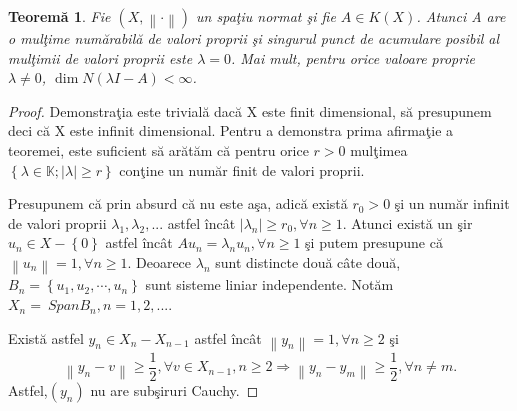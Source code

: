 \documentclass[a4paper,12pt,oneside]{report}
\newtheorem{theorem}{Teorem\u a}
\begin{document}
\begin{theorem}
Fie \(\left ( X, \left \| \cdot  \right \| \right )\) un spa\c{t}iu normat \c{s}i fie \(A \in K\left ( X \right )\). Atunci A are o mul\c{t}ime num\u{a}rabil\u{a} de valori proprii \c{s}i singurul punct de acumulare posibil al mul\c{t}imii de valori proprii este \( \lambda = 0 \). Mai mult, pentru orice valoare proprie \( \lambda \neq 0\), \(\dim N\left ( \lambda I - A \right )< \infty \).
\end{theorem}
\begin{proof}
Demonstra\c{t}ia este trivial\u{a} dac\u{a} X este finit dimensional, s\u{a} presupunem deci c\u{a} X este infinit dimensional. Pentru a demonstra prima afirma\c{t}ie a teoremei, este suficient s\u{a} ar\u{a}t\u{a}m c\u{a} pentru orice \(r> 0\) mul\c{t}imea \(\left \{ \lambda \in \mathbb{K};\left | \lambda  \right |\geq r \right \}\) con\c{t}ine un num\u{a}r finit de valori proprii.

Presupunem c\u{a} prin absurd c\u{a} nu este a\c{s}a, adic\u{a} exist\u{a} \(r_{0}> 0\) \c{s}i un num\u{a}r infinit de valori proprii \(\lambda _{1}, \lambda _{2},...\) astfel \^{i}nc\^{a}t \(\left | \lambda _{n} \right | \geq r_{0}, \forall n\geq 1\). Atunci exist\u{a} un \c{s}ir \(u_{n} \in X -\left \{ 0 \right \}\) astfel \^{i}nc\^{a}t \(Au_{n} = \lambda _{n}u_{n}, \forall n\geq 1\) \c{s}i putem presupune c\u{a} \(\left \| u_{n} \right \| = 1, \forall n\geq 1\). Deoarece \(\lambda _{n}\) sunt distincte dou\u{a} c\^{a}te dou\u{a}, \(B_{n} = \left \{ u_{1},u_{2},\cdots,u_{n} \right \}\) sunt sisteme liniar independente. Not\u{a}m \(X_{n} = \ SpanB_{n} , n=1,2,...\).

Exist\u{a} astfel \(y_{n} \in X_{n} - X_{n-1}\) astfel \^{i}nc\^{a}t \(\left \| y_{n} \right \| = 1, \forall n\geq 2\) \c{s}i
\begin{displaymath}
  \left \| y_{n}-v \right \|\geq \frac{1}{2}, \forall v \in X_{n-1}, n\geq 2 \Rightarrow \left \| y_{n} - y_{m} \right \|\geq \frac{1}{2}, \forall n \neq m.
\end{displaymath}
Astfel,\(\left ( y_{n} \right )\) nu are sub\c{s}iruri Cauchy.


\end{proof}
\end{document}
